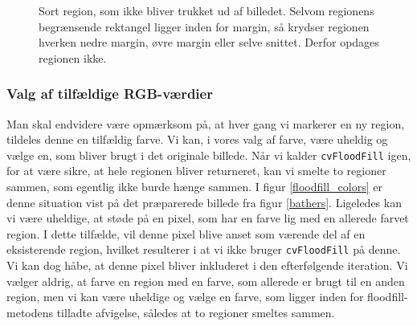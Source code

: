 {\begin{figure}[h]
    \setlength\fboxsep{0pt}
    \setlength\fboxrule{0.5pt}
    \centering
    \caption[]{Sort region, som ikke bliver trukket ud af billedet.
    Selvom regionens begrænsende rektangel ligger inden for margin, så
    krydser regionen hverken nedre margin, øvre margin eller selve
    snittet. Derfor opdages regionen ikke.}
    \label{respect_to_cut}
\end{figure}

\subsubsection{Valg af tilfældige RGB-værdier}
Man skal endvidere være opmærksom på, at hver gang vi markerer en ny
region, tildeles denne en tilfældig farve.  Vi kan, i vores valg af
farve, være uheldig og vælge en, som bliver brugt i det originale
billede. Når vi kalder \texttt{cvFloodFill} igen, for at være sikre, at
hele regionen bliver returneret, kan vi smelte to regioner sammen, som
egentlig ikke burde hænge sammen. I figur \ref{floodfill_colors} er
denne situation vist på det præparerede billede fra figur \ref{bathers}.
Ligeledes kan vi være uheldige, at støde på en pixel, som har en farve
lig med en allerede farvet region. I dette tilfælde, vil denne pixel
blive anset som værende del af en eksisterende region, hvilket
resulterer i at vi ikke bruger \texttt{cvFloodFill} på denne. Vi kan dog
håbe, at denne pixel bliver inkluderet i den efterfølgende iteration.
Vi vælger aldrig, at farve en region med en farve, som allerede er brugt
til en anden region, men vi kan være uheldige og vælge en farve, som
ligger inden for floodfill-metodens tilladte afvigelse, således at to
regioner smeltes sammen.

}
